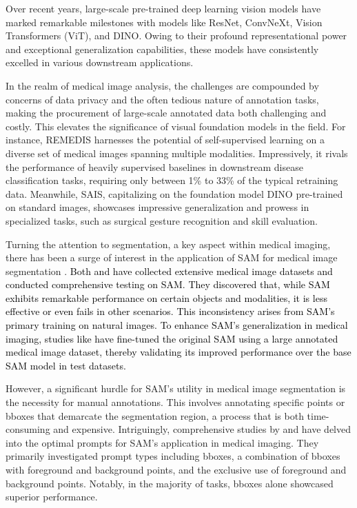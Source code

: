 \documentclass[times,twocolumn,final]{elsarticle}
\begin{document}
\par Over recent years, large-scale pre-trained deep learning vision models have marked remarkable milestones with models like ResNet\citep{he2016deep}, ConvNeXt\citep{liu2022convnet}, Vision Transformers (ViT)\citep{dosovitskiy2020image}, and DINO\citep{caron2021emerging}. Owing to their profound representational power and exceptional generalization capabilities, these models have consistently excelled in various downstream applications.
\par In the realm of medical image analysis, the challenges are compounded by concerns of data privacy and the often tedious nature of annotation tasks, making the procurement of large-scale annotated data both challenging and costly. This elevates the significance of visual foundation models in the field. For instance, REMEDIS\citep{azizi2022robust} harnesses the potential of self-supervised learning on a diverse set of medical images spanning multiple modalities. Impressively, it rivals the performance of heavily supervised baselines in downstream disease classification tasks, requiring only between 1\% to 33\% of the typical retraining data. Meanwhile, SAIS\citep{azizi2022robust}, capitalizing on the foundation model DINO\citep{caron2021emerging} pre-trained on standard images, showcases impressive generalization and prowess in specialized tasks, such as surgical gesture recognition and skill evaluation.
\par Turning the attention to segmentation, a key aspect within medical imaging, there has been a surge of interest in the application of SAM for medical image segmentation \citep{cheng2023sam, he2023sam, MSA, MedSAM, huang2023segment, he2023accuracy, zhang2023customized, mazurowski2023segment, zhang2023segment}. \textcolor{black}{Both \cite{huang2023segment} and \cite{cheng2023sam} have collected extensive medical image datasets and conducted comprehensive testing on SAM. They discovered that, while SAM exhibits remarkable performance on certain objects and modalities, it is less effective or even fails in other scenarios. This inconsistency arises from SAM's primary training on natural images. To enhance SAM's generalization in medical imaging, studies like \cite{MSA, MedSAM} have fine-tuned the original SAM using a large annotated medical image dataset, thereby validating its improved performance over the base SAM model in test datasets. } 

However, a significant hurdle for SAM's utility in medical image segmentation is the necessity for manual annotations. This involves annotating specific points or bboxes that demarcate the segmentation region, a process that is both time-consuming and expensive. Intriguingly, comprehensive studies by \cite{huang2023segment} and \cite{cheng2023sam} have delved into the optimal prompts for SAM's application in medical imaging. They primarily investigated prompt types including bboxes, a combination of bboxes with foreground and background points, and the exclusive use of foreground and background points. Notably, in the majority of tasks, bboxes alone showcased superior performance.
\end{document}

